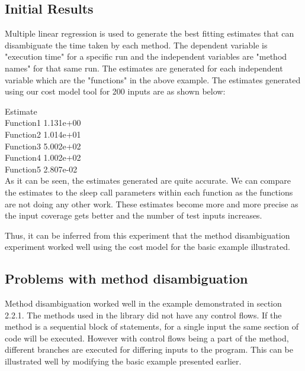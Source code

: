 \subsection{Initial Results}
Multiple linear regression is used to generate the best fitting estimates that can disambiguate the time taken by each method. The dependent variable is "execution time" for a specific run and the independent variables are "method names" for that same run. The estimates are generated for each independent variable which are the "functions" in the above example. The estimates generated using our cost model tool for 200 inputs are as shown below: \newline

\hspace{7em}Estimate   \\
Function1\hspace{2em} 1.131e+00  \\
Function2\hspace{2em} 1.014e+01  \\
Function3\hspace{2em} 5.002e+02  \\
Function4\hspace{2em} 1.002e+02  \\
Function5\hspace{2em} 2.807e-02  \\

As it can be seen, the estimates generated are quite accurate. We can compare the estimates to the sleep call parameters within each function as the functions are not doing any other work. These estimates become more and more precise as the input coverage gets better and the number of test inputs increases. \newline

Thus, it can be inferred from this experiment that the method disambiguation experiment worked well using the cost model for the basic example illustrated. 

\subsection{Problems with method disambiguation}
Method disambiguation worked well in the example demonstrated in section 2.2.1. The methods used in the library did not have any control flows. If the method is a sequential block of statements, for a single input the same section of code will be executed. However with control flows being a part of the method, different branches are executed for differing inputs to the program. This can be illustrated well by modifying the basic example presented earlier.\newline

